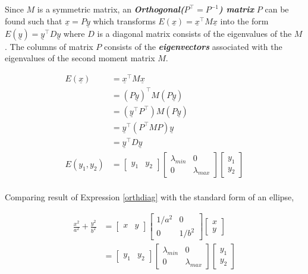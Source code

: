 \documentclass[a4paper,11pt]{article}%
\begin{document}
Since $M$ is a symmetric matrix, an \textbf{\textit{Orthogonal($P^\top=P^{-1}$) matrix}} $P$ can be found such that $\underline{x} = P\underline{y}$  which transforms $E(\underline{x}) = \underline{x}^\top M \underline{x}$ into the form  $E(\underline{y}) = \underline{y}^\top D \underline{y}$ where $D$ is a diagonal matrix consists of the eigenvalues of the $M$. The columns of matrix $P$ consists of the \textbf{\textit{eigenvectors}} associated with the eigenvalues of the second moment matrix $M$.

\begin{equation}
	\begin{split}
E(\underline{x}) &= \underline{x}^\top M \underline{x}\\
&= (P\underline{y})^\top M (P\underline{y})\\
&= (\underline{y}^\top P^\top) M (P\underline{y})\\
&= \underline{y}^\top (P^\top M P)\underline{y}\\
&= \underline{y}^\top D \underline{y}\\
E({y_{1},y_{2}})&= \begin{bmatrix} y_{1} & y_{2} \end{bmatrix}
\begin{bmatrix}
	\lambda_{min} & 0  \\ 0 & \lambda_{max}
\end{bmatrix}
\begin{bmatrix} y_{1} \\ y_{2} \end{bmatrix}\\
	 \end{split}
 \label{orthdiag}
\end{equation}

Comparing result of Expression \ref{orthdiag} with the standard form of an ellipse,

\begin{equation}
	\begin{split}
		{\frac{x^2}{a^2} + \frac{y^2}{b^2}} &= {\begin{bmatrix} x & y \end{bmatrix}
		\begin{bmatrix} 1/a^2 & 0 \\ 0 & 1/b^2 \end{bmatrix}
		\begin{bmatrix} x \\ y \end{bmatrix}} \\
 &= {\begin{bmatrix} y_{1} & y_{2} \end{bmatrix}
		\begin{bmatrix}\lambda_{min} & 0  \\ 0 & \lambda_{max} \end{bmatrix}
		\begin{bmatrix} y_{1} \\ y_{2} \end{bmatrix}}\\
	\end{split}
\end{equation}
\end{document}

